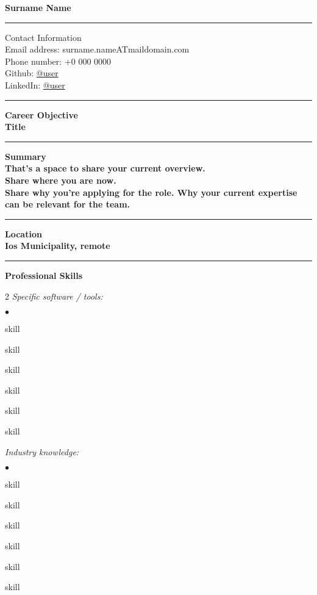 \documentclass[oneside,final,12pt]{extreport}
\newenvironment{compactlist}{
	\begin{list}{{$\bullet$}}{
		\setlength\leftmargin{0.4cm}
		\setlength\partopsep{0pt}
		\setlength\parskip{0pt}
		\setlength\parsep{0pt}
		\setlength\topsep{0pt}
		\setlength\itemsep{0pt}
	}
}{
	\end{list}
}
\begin{document}
\bfseries
Surname Name \\
\rule{\textwidth}{0.4pt}
Contact Information \\
\noindent
\mdseries
Email address: 
surname.nameATmaildomain.com \\
Phone number: 
+0 000 0000 \\
Github:
\href{https://github.com/user}{@user} \\
LinkedIn:
\href{https://www.linkedin.com/in/username}{@user} \\
\rule{\textwidth}{0.4pt}

\bfseries
Career Objective \\
\mdseries
Title \\
\rule{\textwidth}{0.4pt}

\bfseries
Summary \\
\mdseries
That's a space to share your current overview. \\
Share where you are now. \\[5pt]
Share why you're applying for the role. Why your current expertise can be relevant for the team. \\
\rule{\textwidth}{0.4pt}

\bfseries
Location \\
\mdseries
Ios Municipality, remote \\
\rule{\textwidth}{0.4pt}

\bfseries
Professional Skills
\mdseries
\begin{multicols}{2}
\textsl{Specific software / tools:}
	 \begin{compactlist}
		 \item skill
		 \item skill
		 \item skill
		 \item skill
		 \item skill
		 \item skill
	 \end{compactlist}
\textsl{Industry knowledge:}
	 \begin{compactlist}
		 \item skill
		 \item skill
		 \item skill
		 \item skill
		 \item skill
		 \item skill
	 \end{compactlist}
\end{multicols}
\end{document}
